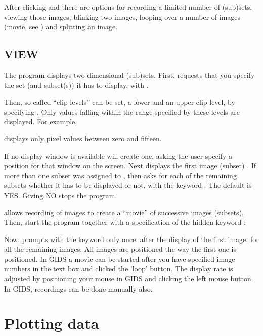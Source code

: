 After clicking  and  there are options
for recording a limited number of (sub)sets, viewing those images,
blinking two images, looping over a number of images (movie, see
) and splitting an image.

\subsection*{VIEW}

The program  displays two-dimensional (sub)sets.  First,
 requests that you specify the set (and subset(s)) it has to
display, with . 
 
Then, so-called ``clip levels'' can be set, a lower and an upper clip
level, by specifying .  Only values falling within the
range specified by these levels are displayed.  For example,


displays only pixel values between zero and fifteen.

If no display window is available  will create one, asking
the user specify a position for that window on the screen.  Next
 displays the first image (subset) .  If more than one
subset was assigned to , then  asks for
each of the remaining subsets whether it has to be displayed or not,
with the keyword .  The default is YES.  Giving NO stops
the program. 

 allows  recording of images to create a ``movie'' of
successive images (subsets).  Then, start the program together with a
specification of the hidden keyword :


Now,  prompts with the keyword  only once:
after the display of the first image, for all the remaining images.  All
images are positioned the way the first one is positioned. 
In GIDS a movie can be started after you have specified image numbers
in the text box and clicked the 'loop' button. The display rate
is adjusted by positioning your mouse in GIDS and clicking the left 
mouse button. In GIDS, recordings can be done manually also.

\section{Plotting data}

